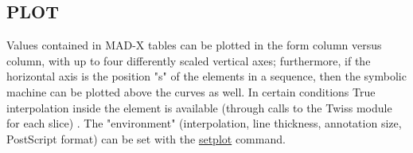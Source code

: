 % 






\subsection{PLOT}

 Values contained in MAD-X tables can be plotted in the form column versus column, with up to four differently scaled vertical axes; furthermore, if the horizontal axis is the position "s" of the elements in a sequence, then the symbolic machine can be plotted above the curves as well. In certain conditions True interpolation inside the element is available (through calls to the Twiss module for each slice) .  The "environment" (interpolation, line thickness, annotation size, PostScript format) can be set with the \hyperlink{setplot}{setplot} command.  
